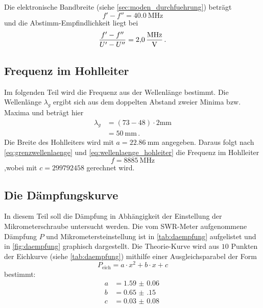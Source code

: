 Die elektronische Bandbreite (siehe \autoref{sec:moden_durchfuehrung}) beträgt
\begin{equation*}
    f' - f'' = \SI{40.0}{\mega\hertz}
\end{equation*}
und die Abstimm-Empfindlichkeit liegt bei
\begin{equation*}
    \frac{f' - f''}{U' - U''} = \SI{2.0}{\frac{\mega\hertz}{\volt}} \, .
\end{equation*}
\FloatBarrier

\subsection{Frequenz im Hohlleiter}
Im folgenden Teil wird die Frequenz aus der Wellenlänge bestimmt.
Die Wellenlänge $\lambda_g$ ergibt sich aus dem doppelten Abstand zweier Minima bzw. Maxima und beträgt hier
\begin{align*}
    \lambda_g &= (73 - 48) \cdot 2 \si{\milli \metre} \\
    &= \SI{50}{\milli \metre} \, .
\end{align*}
Die Breite des Hohlleiters wird mit $a = \SI{22.86}{\milli \metre}$ angegeben.
Daraus folgt nach \autoref{eq:grenzwellenlaenge} und \autoref{eq:wellenlaenge_hohleiter} die Frequenz im Hohlleiter
\begin{equation*}
    f = \SI{8885}{\mega\hertz}
\end{equation*}
,wobei mit $c = 299792458$ gerechnet wird.
\FloatBarrier

\subsection{Die Dämpfungskurve}
In diesem Teil soll die Dämpfung in Abhängigkeit der Einstellung der Mikrometerschraube untersucht werden.
Die vom SWR-Meter aufgenommene Dämpfung $P$ und Mikrometersteinstellung ist in \autoref{tab:daempfung} aufgelistet und in \autoref{fig:daempfung} graphisch dargestellt.
Die Theorie-Kurve wird aus $10$ Punkten der Eichkurve (siehe \autoref{tab:daempfung}) mithilfe einer Ausgleichsparabel der Form
\begin{equation*}
    P_\text{eich} = a \cdot x^2 + b \cdot x + c 
\end{equation*}
bestimmt:
\begin{align*}
    a &= \SI{1.59(6)}{} \\
    b &= \SI{0.65(15)}{} \\
    c &= \SI{0.03(8)}{}
\end{align*}

